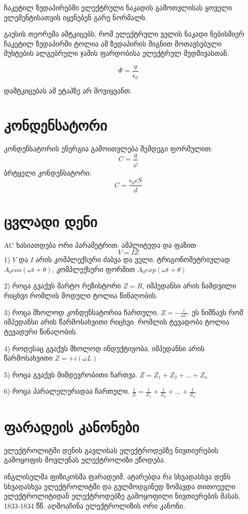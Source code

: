 \documentclass[a4paper]{book}
\begin{document}
ჩაკეტილ ზედაპირებში ელექტრული ნაკადის გამოთვლისას ყოველი
ელემენტისათვის იყენებენ გარე ნორმალს.
 
გაუსის თეორემა ამტკიცებს, რომ ელექტრული ველის ნაკადი ნებისმიერ ჩაკეტილ ზედაპირში ტოლია ამ ზედაპირის შიგნით მოთავსებული მუხტების ალგებრული ჯამის ფარდობისა ელექტრულ მუდმივასთან.

$$\Phi = \frac{q}{\epsilon_0}$$

დამტკიცებას ამ ეტაპზე არ მოვიყვანთ.
\section{კონდენსატორი}
კონდენსატორის ენერგია გამოითვლება შემდეგი ფორმულით:
$$C = \frac{q}{\varphi}$$
ბრტყელი კონდენსატორი:
$$C = \frac{\epsilon_0 \epsilon S}{d}$$

\section{ცვლადი დენი}

AC ხასიათდება ორი პარამეტრით: ამპლიტუდა და ფაზით
$$V = IZ$$
1) $V$ და $I$ არის კომპლექსური ძაბვა და ველი. ტრიგონომეტრიულად $A_0cos(\omega t + \theta)$, კომპლექსური ფორმით $A_0exp(\omega t + \theta)$

2) როცა გვაქვს მარტო რეზისტორი $Z=R$, იმპედანსი არის ნამდვილი რიცხვი რომლის მოდული ტოლია წინაღობის.

3) როცა მხოლოდ კონდენსატორია ჩართული, $Z=-\frac{i}{\omega C}$. ეს ნიშნავს რომ იმპედანსი არის წარმოსახვითი რიცხვი. რომლის ტევადობა ტოლია ტევადური წინაღობის.

4) როდესაც გვაქვს მხოლოდ ინდუქტივობა, იმპედანსი არის წარმოსახვითი $Z = + i(\omega L)$ 

5) როცა გვაქვს მიმდევრობითი ჩართვა. $Z = Z_1 + Z_2 + ... + Z_n$

6) როცა პარალელურადაა ჩართული. $\frac{1}{Z} = \frac{1}{Z_1} + \frac{1}{Z_2} + ... + \frac{1}{Z_n}$

\section{ფარადეის კანონები}

ელექტროლიტში დენის გავლისას ელექტროდებზე ნივთიერების გამოყოფის მოვლენას ელექტროლიზი ეწოდება.

ინგლისელმა ფიზიკოსმა ფარადეიმ, ატარებდა რა სხვადასხვა დენს
სხვადასხვა ელექტროლიტში და გულმოდგინედ ზომავდა თითოეული
ელექტროლიტიდან ელექტროდებზე გამოყოფილი ნივთიერების მასას,
1833-1834 წწ. აღმოაჩინა ელექტროლიზის ორი კანონი.
\end{document}
